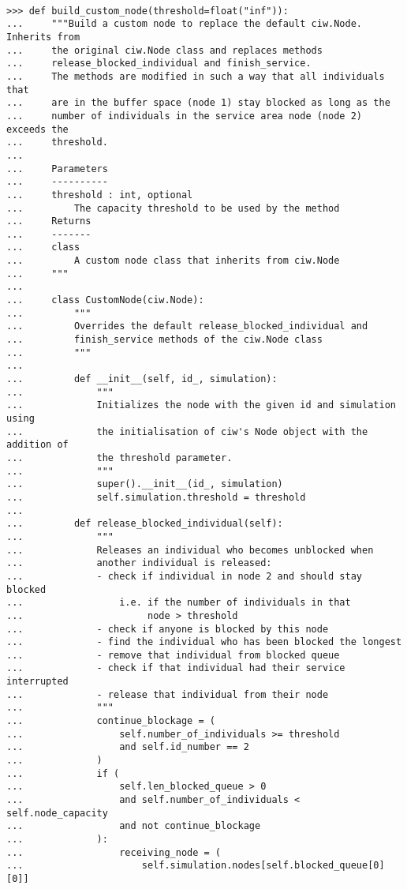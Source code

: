 \begin{lstlisting}[style=pystyle]

>>> def build_custom_node(threshold=float("inf")):
...     """Build a custom node to replace the default ciw.Node. Inherits from
...     the original ciw.Node class and replaces methods
...     release_blocked_individual and finish_service.
...     The methods are modified in such a way that all individuals that
...     are in the buffer space (node 1) stay blocked as long as the
...     number of individuals in the service area node (node 2) exceeds the
...     threshold.
...
...     Parameters
...     ----------
...     threshold : int, optional
...         The capacity threshold to be used by the method
...     Returns
...     -------
...     class
...         A custom node class that inherits from ciw.Node
...     """
...
...     class CustomNode(ciw.Node):
...         """
...         Overrides the default release_blocked_individual and
...         finish_service methods of the ciw.Node class
...         """
...
...         def __init__(self, id_, simulation):
...             """
...             Initializes the node with the given id and simulation using
...             the initialisation of ciw's Node object with the addition of
...             the threshold parameter.
...             """
...             super().__init__(id_, simulation)
...             self.simulation.threshold = threshold
...
...         def release_blocked_individual(self):
...             """
...             Releases an individual who becomes unblocked when
...             another individual is released:
...             - check if individual in node 2 and should stay blocked
...                 i.e. if the number of individuals in that
...                      node > threshold
...             - check if anyone is blocked by this node
...             - find the individual who has been blocked the longest
...             - remove that individual from blocked queue
...             - check if that individual had their service interrupted
...             - release that individual from their node
...             """
...             continue_blockage = (
...                 self.number_of_individuals >= threshold
...                 and self.id_number == 2
...             )
...             if (
...                 self.len_blocked_queue > 0
...                 and self.number_of_individuals < self.node_capacity
...                 and not continue_blockage
...             ):
...                 receiving_node = (
...                     self.simulation.nodes[self.blocked_queue[0][0]]

\end{lstlisting}
